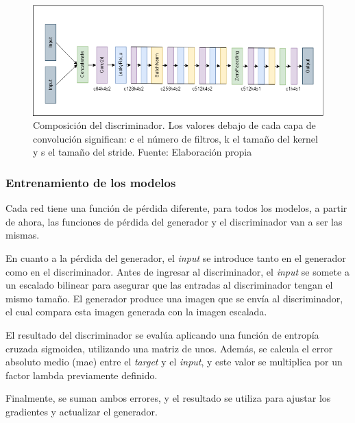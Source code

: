 \begin{figure}[H]
	\centering
	\includegraphics[width=1\textwidth]{figures/discriminator.png}
	\caption{\label{fig:discriminator}Composición del discriminador. Los valores debajo de cada capa de convolución significan: c el número de filtros, k el tamaño del kernel y s el tamaño del stride. Fuente: Elaboración propia}
\end{figure}


\subsubsection{Entrenamiento de los modelos}

Cada red tiene una función de pérdida diferente, para todos los modelos, a partir de ahora, las funciones de pérdida del generador y el discriminador van a ser las mismas.

En cuanto a la pérdida del generador, el \textit{input} se introduce tanto en el generador como en el discriminador. Antes de ingresar al discriminador, el \textit{input} se somete a un escalado bilinear para asegurar que las entradas al discriminador tengan el mismo tamaño. El generador produce una imagen que se envía al discriminador, el cual compara esta imagen generada con la imagen escalada.

El resultado del discriminador se evalúa aplicando una función de entropía cruzada sigmoidea, utilizando una matriz de unos. Además, se calcula el error absoluto medio (\gls{mae}) entre el \textit{target} y el \textit{input}, y este valor se multiplica por un factor lambda previamente definido.

Finalmente, se suman ambos errores, y el resultado se utiliza para ajustar los gradientes y actualizar el generador.


